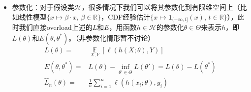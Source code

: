 \documentclass[11pt,a4paper]{ctexart}
\numberwithin{equation}{section}%
\begin{document}
\begin{itemize}[topsep=2pt,itemsep=0pt]
    \item 参数化：对于假设类$\mathcal{H}$，很多情况下我们可以将其参数化到有限维空间上（比如线性模型$ \{ x\mapsto \beta \cdot x,\, \beta\in \mathbb{R} \} $，CDF经验估计$ \{x\mapsto \mathbf{1}_{(-\infty, t]}(x),\,t\in \mathbb{R}\} $），此时我们直接overload上述的$L$和$E$，用函数$h\in\mathcal{H}$的参数化$\theta \in \Theta$来表示$h$，即$L(\theta)$和$E(\theta, \theta ^*)$。（非参数化情形暂不讨论）
    \begin{align*}
    L(\theta )=& \mathop{ \mathbb{E} }\limits_{X,Y} \left[ \ell\left( h(X;\theta),Y \right) \right] \\ 
    E(\theta ,\theta ^*)=& L(\theta ) - \inf_{\theta' \in \Theta} L(\theta')= L(\theta ) - L(\theta ^*)\\
    \hat{L}_n(\theta )=& \frac{1}{n} \sum_{i=1}^n \ell\left( h(x_i;\theta),y_i \right)
    \end{align*}

\end{itemize}
\end{document}
